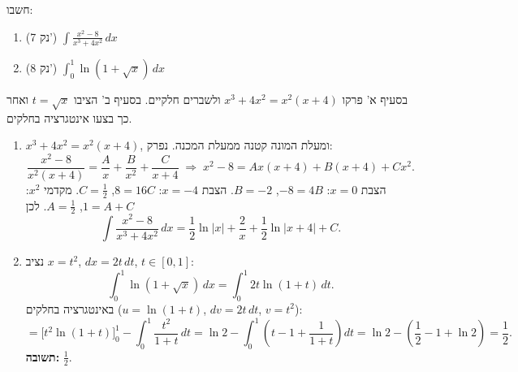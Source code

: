 
\begin{question}
חשבו:
\begin{enumerate}
  \item[א.] (7 נק') $\displaystyle\int\frac{x^2-8}{x^3+4x^2}\,dx$
  \item[ב.] (8 נק') $\displaystyle\int_0^1\ln(1+\sqrt x)\,dx$
\end{enumerate}
\end{question}

\begin{hint}
בסעיף א' פרקו $x^3+4x^2=x^2(x+4)$ ולשברים חלקיים. בסעיף ב' הציבו $t=\sqrt x$ ואחר כך בצעו אינטגרציה בחלקים.
\end{hint}

\begin{solution}
\begin{enumerate}
  \item[א.] $x^3+4x^2=x^2(x+4)$, ומעלת המונה קטנה ממעלת המכנה. נפרק:
  \[ \frac{x^2-8}{x^2(x+4)}=\frac Ax+\frac B{x^2}+\frac C{x+4}\;\Longrightarrow\;x^2-8=Ax(x+4)+B(x+4)+Cx^2. \]
  הצבת $x=0$: $-8=4B$, $B=-2$. הצבת $x=-4$: $8=16C$, $C=\frac12$. מקדמי $x^2$: $1=A+C$, $A=\frac12$. לכן
  \[ \int\frac{x^2-8}{x^3+4x^2}\,dx=\frac12\ln|x|+\frac2x+\frac12\ln|x+4|+C. \]
  \item[ב.] נציב $x=t^2$, $dx=2t\,dt$, $t\in[0,1]$:
  \[ \int_0^1\ln(1+\sqrt x)\,dx=\int_0^1 2t\ln(1+t)\,dt. \]
  באינטגרציה בחלקים ($u=\ln(1+t)$, $dv=2t\,dt$, $v=t^2$):
  \[ =\Big[t^2\ln(1+t)\Big]_0^1-\int_0^1\frac{t^2}{1+t}\,dt=\ln2-\int_0^1\left(t-1+\frac1{1+t}\right)dt=\ln2-\left(\frac12-1+\ln2\right)=\frac12. \]
  \textbf{תשובה:} $\frac12$.
\end{enumerate}
\end{solution}
